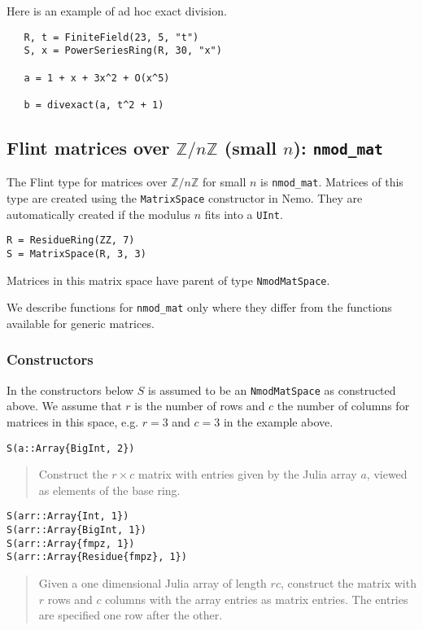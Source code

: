 \documentclass[a4paper,10pt]{article}
\newcommand{\Z}{\mathbb{Z}}
\newcommand{\code}{\lstinline}
\newcommand{\desc}[1]{\vspace{-3mm}\begin{quote}#1\end{quote}}
\begin{document}
{{Here is an example of ad hoc exact division.

\begin{lstlisting}
   R, t = FiniteField(23, 5, "t")
   S, x = PowerSeriesRing(R, 30, "x")

   a = 1 + x + 3x^2 + O(x^5)
   
   b = divexact(a, t^2 + 1)
\end{lstlisting}

\subsection{Flint matrices over $\Z/n\Z$ (small $n$): \code{nmod_mat}}

The Flint type for matrices over $\Z/n\Z$ for small $n$ is \code{nmod_mat}. Matrices
of this type are created using the \code{MatrixSpace} constructor in Nemo. They are
automatically created if the modulus $n$ fits into a \code{UInt}.

\begin{lstlisting}
R = ResidueRing(ZZ, 7)
S = MatrixSpace(R, 3, 3)
\end{lstlisting}

Matrices in this matrix space have parent of type \code{NmodMatSpace}.

We describe functions for \code{nmod_mat} only where they differ from the functions
available for generic matrices.

\subsubsection{Constructors}

In the constructors below $S$ is assumed to be an \code{NmodMatSpace} as constructed above.
We assume that $r$ is the number of rows and $c$ the number of columns for matrices in this
space, e.g. $r = 3$ and $c = 3$ in the example above.

\begin{lstlisting}
S(a::Array{BigInt, 2})
\end{lstlisting}

\desc{Construct the $r\times c$ matrix with entries given by the Julia array $a$, viewed
as elements of the base ring.}

\begin{lstlisting}
S(arr::Array{Int, 1})
S(arr::Array{BigInt, 1})
S(arr::Array{fmpz, 1})
S(arr::Array{Residue{fmpz}, 1})
\end{lstlisting}

\desc{Given a one dimensional Julia array of length $rc$, construct the matrix with $r$
rows and $c$ columns with the array entries as matrix entries. The entries are specified
one row after the other.}

}}
\end{document}
